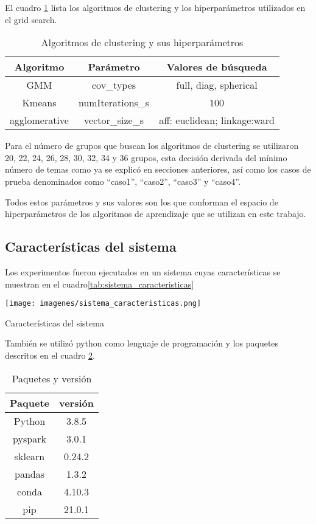 \documentclass[12pt]{article}
\begin{document}
		El cuadro \ref{tab:clustering_parameters} lista los algoritmos de clustering y los hiperparámetros utilizados en el grid search.
		\begin{table}[H]
		\begin{tabular}{c|c|c}
		Algoritmo       & Parámetro         & Valores de búsqueda \\ \hline
		GMM				& cov\_types    	& full, diag, spherical \\ 
		Kmeans	        & numIterations\_s	& 100			      \\ 
		agglomerative   & vector\_size\_s   & aff: euclidean; linkage:ward \\ 
		\end{tabular}
		\centering
		\caption{Algoritmos de clustering y sus hiperparámetros}
		\label{tab:clustering_parameters}
		\end{table}
		
		Para el número de grupos que buscan los algoritmos de clustering se utilizaron 20, 22, 24, 26, 28, 30, 32, 34 y 36 grupos, esta decisión derivada del mínimo número de temas como ya se explicó en secciones anteriores, así como los casos de prueba denominados como ``caso1'', ``caso2'', ``caso3'' y ``caso4''.
		
		Todos estos parámetros y sus valores son los que conforman el espacio de hiperparámetros de los algoritmos de aprendizaje que se utilizan en este trabajo.
		
		\subsection{Características del sistema}
		Los experimentos fueron ejecutados en un sistema cuyas características se muestran en el cuadro\ref{tab:sistema_caracteristicas}	
		\begin{table}[H]
			\texttt{[image: imagenes/sistema\_caracteristicas.png]}
			\centering
			\caption{Características del sistema}
			\label{tab:sistema_caracteristicas}
		\end{table}
		
		También se utilizó python como lenguaje de programación y los paquetes descritos en el cuadro \ref{tab:pack_version}.
		\begin{table}[H]
		\begin{tabular}{c|c}
		Paquete			& versión   \\ \hline
		Python			& 3.8.5		\\ 
		pyspark	        & 3.0.1		\\ 
		sklearn			& 0.24.2	\\ 
		pandas			& 1.3.2		\\
		conda			& 4.10.3	\\ 
		pip				& 21.0.1	\\
		\end{tabular}
		\centering
		\caption{Paquetes y versión}
		\label{tab:pack_version}
		\end{table}
		
\end{document}
